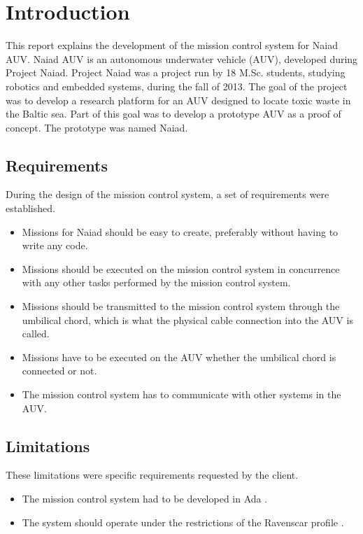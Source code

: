 \section{Introduction}\label{sec:introduction}
This report explains the development of the mission control system for Naiad AUV. Naiad AUV is an autonomous underwater vehicle (AUV), developed during Project Naiad. Project Naiad was a project run by 18 M.Sc. students, studying robotics and embedded systems, during the fall of 2013. The goal of the project was to develop a research platform for an AUV designed to locate toxic waste in the Baltic sea. Part of this goal was to develop a prototype AUV as a proof of concept. The prototype was named Naiad.

\subsection{Requirements}
During the design of the mission control system, a set of requirements were established.
\begin{itemize}
\item Missions for Naiad should be easy to create, preferably without having to write any code.
\item Missions should be executed on the mission control system in concurrence with any other tasks performed by the mission control system.
\item Missions should be transmitted to the mission control system through the umbilical chord, which is what the physical cable connection into the AUV is called.
\item Missions have to be executed on the AUV whether the umbilical chord is connected or not.
\item The mission control system has to communicate with other systems in the AUV.
\end{itemize}

\subsection{Limitations}
These limitations were specific requirements requested by the client.
\begin{itemize}
\item The mission control system had to be developed in Ada \cite{web:mcsada}.
\item The system should operate under the restrictions of the Ravenscar profile \cite{article:mcsraven}. 
\end{itemize}
